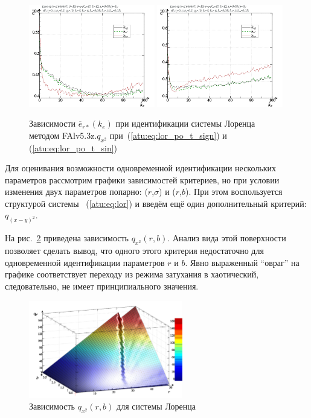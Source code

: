 \begin{figure}[h!]
  \centerline{
    \includegraphics[width=0.49\textwidth]{p/cha/lor/FAlv5.3z/lor_FAlv5_3z_qx2-p_ke_e_sign.png}
    \hfill
    \includegraphics[width=0.49\textwidth]{p/cha/lor/FAlv5.3z/lor_FAlv5_3z_qx2-p_ke_e_sin.png}
  }
  \caption{Зависимости $\overline{e}_{r*}(k_e)$ при идентификации системы Лоренца методом FAlv5.3z.$q_{x^2}$
   при~(\ref{atu:eq:lor_po_t_sign}) и (\ref{atu:eq:lor_po_t_sin})}
  \label{atu:f:lor_ke_FAlv5.3z.q_x2}
\end{figure}

Для оценивания возможности одновременной идентификации нескольких параметров
рассмотрим графики зависимостей критериев, но при условии
изменения двух параметров попарно: ($r$,$\sigma$) и ($r$,$b$).
При этом воспользуется структурой системы ~(\ref{atu:eq:lor})
и введём ещё один дополнительный критерий: $q_{(x-y)^2}$.

На рис.~\ref{atu:f:lor_qx2_r_b} приведена зависимость
$q_{x^2}(r,b)$.
Анализ вида этой поверхности позволяет сделать вывод,
что одного этого критерия недостаточно для
одновременной идентификации параметров $r$ и $b$.
Явно выраженный ``овраг'' на графике соответствует
переходу из режима затухания в хаотический,
следовательно, не имеет принципиального значения.

\begin{figure}[h!]
  \centerline{  \includegraphics[width=0.60\textwidth]{p/cha/lor/q2d/lor_qx2_r_b.png}  }
  \caption{Зависимость $q_{x^2}(r,b)$ для системы Лоренца}
  \label{atu:f:lor_qx2_r_b}
\end{figure}


